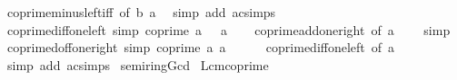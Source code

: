 \begin{isabellebody}
\ coprime{\isacharunderscore}{\kern0pt}minus{\isacharunderscore}{\kern0pt}left{\isacharunderscore}{\kern0pt}iff\ {\isacharbrackleft}{\kern0pt}of\ b\ a{\isacharbrackright}{\kern0pt}\ \isamarkupfalse%
\ {\isacharparenleft}{\kern0pt}simp\ add{\isacharcolon}{\kern0pt}\ ac{\isacharunderscore}{\kern0pt}simps{\isacharparenright}{\kern0pt}%
\endisatagproof
{\isafoldproof}%
%
\isadelimproof
\isanewline
%
\endisadelimproof
\isanewline
{}\isamarkupfalse%
\ coprime{\isacharunderscore}{\kern0pt}diff{\isacharunderscore}{\kern0pt}one{\isacharunderscore}{\kern0pt}left\ {\isacharbrackleft}{\kern0pt}simp{\isacharbrackright}{\kern0pt}{\isacharcolon}{\kern0pt}\ {\isachardoublequoteopen}coprime\ {\isacharparenleft}{\kern0pt}a\ {\isacharminus}{\kern0pt}\ {}{\isacharparenright}{\kern0pt}\ a{\isachardoublequoteclose}\isanewline
%
\isadelimproof
\ \ %
\endisadelimproof
%
\isatagproof
{}\isamarkupfalse%
\ coprime{\isacharunderscore}{\kern0pt}add{\isacharunderscore}{\kern0pt}one{\isacharunderscore}{\kern0pt}right\ {\isacharbrackleft}{\kern0pt}of\ {\isachardoublequoteopen}a\ {\isacharminus}{\kern0pt}\ {}{\isachardoublequoteclose}{\isacharbrackright}{\kern0pt}\ \isamarkupfalse%
\ simp%
\endisatagproof
{\isafoldproof}%
%
\isadelimproof
\isanewline
%
\endisadelimproof
\isanewline
{}\isamarkupfalse%
\ coprime{\isacharunderscore}{\kern0pt}doff{\isacharunderscore}{\kern0pt}one{\isacharunderscore}{\kern0pt}right\ {\isacharbrackleft}{\kern0pt}simp{\isacharbrackright}{\kern0pt}{\isacharcolon}{\kern0pt}\ {\isachardoublequoteopen}coprime\ a\ {\isacharparenleft}{\kern0pt}a\ {\isacharminus}{\kern0pt}\ {}{\isacharparenright}{\kern0pt}{\isachardoublequoteclose}\isanewline
%
\isadelimproof
\ \ %
\endisadelimproof
%
\isatagproof
{}\isamarkupfalse%
\ coprime{\isacharunderscore}{\kern0pt}diff{\isacharunderscore}{\kern0pt}one{\isacharunderscore}{\kern0pt}left\ {\isacharbrackleft}{\kern0pt}of\ a{\isacharbrackright}{\kern0pt}\ \isamarkupfalse%
\ {\isacharparenleft}{\kern0pt}simp\ add{\isacharcolon}{\kern0pt}\ ac{\isacharunderscore}{\kern0pt}simps{\isacharparenright}{\kern0pt}%
\endisatagproof
{\isafoldproof}%
%
\isadelimproof
\isanewline
%
\endisadelimproof
\isanewline
{}\isamarkupfalse%
\isanewline
\isanewline
{}\isamarkupfalse%
\ semiring{\isacharunderscore}{\kern0pt}Gcd\isanewline
{}\isanewline
\isanewline
{}\isamarkupfalse%
\ Lcm{\isacharunderscore}{\kern0pt}coprime{\isacharcolon}{\kern0pt}\isanewline

\end{isabellebody}
